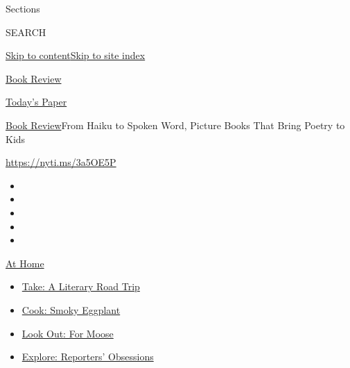 Sections

SEARCH

\protect\hyperlink{site-content}{Skip to
content}\protect\hyperlink{site-index}{Skip to site index}

\href{https://www.nytimes3xbfgragh.onion/section/books/review}{Book
Review}

\href{https://myaccount.nytimes3xbfgragh.onion/auth/login?response_type=cookie\&client_id=vi}{}

\href{https://www.nytimes3xbfgragh.onion/section/todayspaper}{Today's
Paper}

\href{/section/books/review}{Book Review}\textbar{}From Haiku to Spoken
Word, Picture Books That Bring Poetry to Kids

\url{https://nyti.ms/3a5OE5P}

\begin{itemize}
\item
\item
\item
\item
\item
\end{itemize}

\href{https://www.nytimes3xbfgragh.onion/spotlight/at-home?action=click\&pgtype=Article\&state=default\&region=TOP_BANNER\&context=at_home_menu}{At
Home}

\begin{itemize}
\tightlist
\item
  \href{https://www.nytimes3xbfgragh.onion/2020/07/28/books/time-for-a-literary-road-trip.html?action=click\&pgtype=Article\&state=default\&region=TOP_BANNER\&context=at_home_menu}{Take:
  A Literary Road Trip}
\item
  \href{https://www.nytimes3xbfgragh.onion/2020/07/29/magazine/bored-with-your-home-cooking-some-smoky-eggplant-will-fix-that.html?action=click\&pgtype=Article\&state=default\&region=TOP_BANNER\&context=at_home_menu}{Cook:
  Smoky Eggplant}
\item
  \href{https://www.nytimes3xbfgragh.onion/2020/07/27/travel/moose-michigan-isle-royale.html?action=click\&pgtype=Article\&state=default\&region=TOP_BANNER\&context=at_home_menu}{Look
  Out: For Moose}
\item
  \href{https://www.nytimes3xbfgragh.onion/interactive/2020/at-home/even-more-reporters-editors-diaries-lists-recommendations.html?action=click\&pgtype=Article\&state=default\&region=TOP_BANNER\&context=at_home_menu}{Explore:
  Reporters' Obsessions}
\end{itemize}

